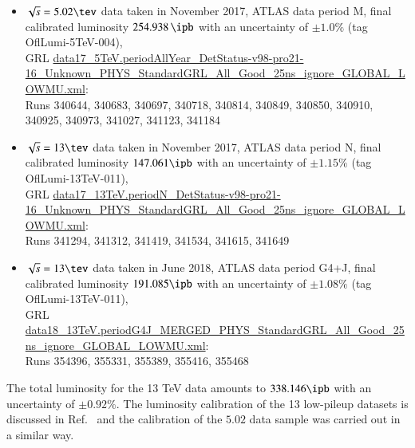 \begin{itemize}
\item $\sqrt{s} = 5.02\tev$ data taken in November 2017, ATLAS data
  period M, final calibrated luminosity $254.938\,\ipb$ with an uncertainty
  of $\pm 1.0\%$ (tag
  OflLumi-5TeV-004), \\GRL
  \href{http://atlasdqm.web.cern.ch/atlasdqm/grlgen/All_Good/data17_5TeV.periodAllYear_DetStatus-v98-pro21-16_Unknown_PHYS_StandardGRL_All_Good_25ns_ignore_GLOBAL_LOWMU.xml}{\scriptsize data17\_5TeV.periodAllYear\_DetStatus-v98-pro21-16\_Unknown\_PHYS\_StandardGRL\_All\_Good\_25ns\_ignore\_GLOBAL\_LOWMU.xml}:\\
  Runs 340644, 340683, 340697, 340718, 340814, 340849, 340850, 340910, 340925, 340973, 341027, 341123, 341184
\item $\sqrt{s} = 13\tev$ data taken in November 2017, ATLAS data
  period N, final calibrated luminosity $147.061\ipb$ with an uncertainty
  of $\pm 1.15\%$ (tag
  OflLumi-13TeV-011), \\GRL
  \href{http://atlasdqm.web.cern.ch/atlasdqm/grlgen/All_Good/data17_13TeV.periodN_DetStatus-v98-pro21-16_Unknown_PHYS_StandardGRL_All_Good_25ns_ignore_GLOBAL_LOWMU.xml}{\scriptsize data17\_13TeV.periodN\_DetStatus-v98-pro21-16\_Unknown\_PHYS\_StandardGRL\_All\_Good\_25ns\_ignore\_GLOBAL\_LOWMU.xml}:\\
  Runs 341294, 341312, 341419, 341534, 341615, 341649
\item $\sqrt{s} = 13\tev$ data taken in June 2018, ATLAS data
  period G4+J, final calibrated luminosity $ 191.085\ipb$ with an uncertainty
  of $\pm 1.08\%$ (tag
  OflLumi-13TeV-011), \\GRL
  \href{http://atlasdqm.web.cern.ch/atlasdqm/grlgen/All_Good/data18_13TeV.periodG4J_MERGED_PHYS_StandardGRL_All_Good_25ns_ignore_GLOBAL_LOWMU.xml}{\scriptsize data18\_13TeV.periodG4J\_MERGED\_PHYS\_StandardGRL\_All\_Good\_25ns\_ignore\_GLOBAL\_LOWMU.xml}:\\
  Runs 354396, 355331, 355389, 355416, 355468
\end{itemize}

The total luminosity for the 13 TeV data amounts to $338.146\ipb$ with
an uncertainty of $\pm 0.92\%$. The luminosity calibration of the 13
\TeV low-pileup datasets is discussed in Ref.~\cite{DAPR-2021-01} and
the calibration of the $5.02$ \TeV data sample was carried out in a
similar way.

